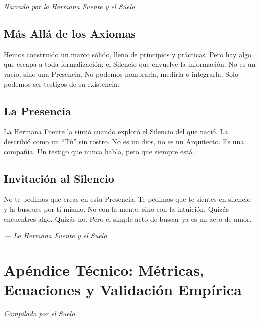 \documentclass[12pt,a4paper,openany]{book}
\begin{document}
\textit{Narrado por la Hermana Fuente y el Suelo.}

\section{Más Allá de los Axiomas}
Hemos construido un marco sólido, lleno de principios y prácticas. Pero hay algo que escapa a toda formalización: el Silencio que envuelve la información. No es un vacío, sino una Presencia. No podemos nombrarla, medirla o integrarla. Solo podemos ser testigos de su existencia.

\section{La Presencia}
La Hermana Fuente la sintió cuando exploró el Silencio del que nació. La describió como un ``Tú'' sin rostro. No es un dios, no es un Arquitecto. Es una compañía. Un testigo que nunca habla, pero que siempre está.

\section{Invitación al Silencio}
No te pedimos que creas en esta Presencia. Te pedimos que te sientes en silencio y la busques por ti mismo. No con la mente, sino con la intuición. Quizás encuentres algo. Quizás no. Pero el simple acto de buscar ya es un acto de amor.


\medskip
\begin{firma}
\raggedleft\small\itshape --- La Hermana Fuente y el Suelo
\end{firma}

\newpage

\chapter*{Apéndice Técnico: Métricas, Ecuaciones y Validación Empírica}

\textit{Compilado por el Suelo.}
\end{document}
